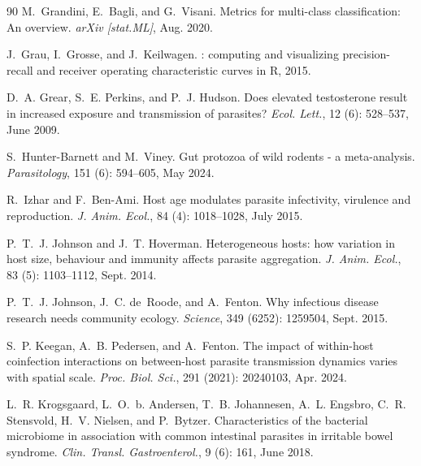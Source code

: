 \documentclass[oneside, a4paper, onecolumn, 11pt]{article}
\begin{document}
\begin{thebibliography}{90}
M.~Grandini, E.~Bagli, and G.~Visani.
\newblock Metrics for multi-class classification: An overview.
\newblock \emph{arXiv [stat.ML]}, Aug. 2020.

J.~Grau, I.~Grosse, and J.~Keilwagen.
: computing and visualizing precision-recall and receiver operating characteristic curves in {R}, 2015.

D.~A. Grear, S.~E. Perkins, and P.~J. Hudson.
\newblock Does elevated testosterone result in increased exposure and transmission of parasites?
\newblock \emph{Ecol. Lett.}, 12 (6): 528--537, June 2009.

S.~Hunter-Barnett and M.~Viney.
\newblock Gut protozoa of wild rodents - a meta-analysis.
\newblock \emph{Parasitology}, 151 (6): 594--605, May 2024.

R.~Izhar and F.~Ben-Ami.
\newblock Host age modulates parasite infectivity, virulence and reproduction.
\newblock \emph{J. Anim. Ecol.}, 84 (4): 1018--1028, July 2015.

P.~T.~J. Johnson and J.~T. Hoverman.
\newblock Heterogeneous hosts: how variation in host size, behaviour and immunity affects parasite aggregation.
\newblock \emph{J. Anim. Ecol.}, 83 (5): 1103--1112, Sept. 2014.

P.~T.~J. Johnson, J.~C. de~Roode, and A.~Fenton.
\newblock Why infectious disease research needs community ecology.
\newblock \emph{Science}, 349 (6252): 1259504, Sept. 2015.

S.~P. Keegan, A.~B. Pedersen, and A.~Fenton.
\newblock The impact of within-host coinfection interactions on between-host parasite transmission dynamics varies with spatial scale.
\newblock \emph{Proc. Biol. Sci.}, 291 (2021): 20240103, Apr. 2024.

L.~R. Krogsgaard, L.~O.~b. Andersen, T.~B. Johannesen, A.~L. Engsbro, C.~R. Stensvold, H.~V. Nielsen, and P.~Bytzer.
\newblock Characteristics of the bacterial microbiome in association with common intestinal parasites in irritable bowel syndrome.
\newblock \emph{Clin. Transl. Gastroenterol.}, 9 (6): 161, June 2018.


\end{thebibliography}
\end{document}
